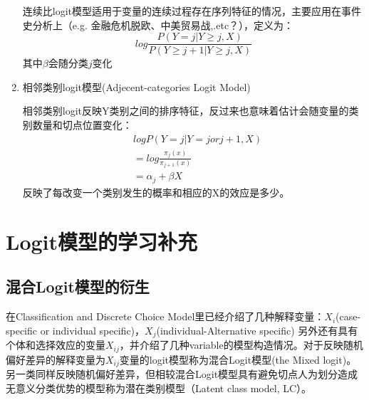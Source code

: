 \documentclass[cn]{elegantpaper}
\begin{document}
\begin{enumerate}
连续比logit模型适用于变量的连续过程存在序列特征的情况，主要应用在事件史分析上（e.g. 金融危机脱欧、中美贸易战,.etc？），定义为：
{\setlength\abovedisplayskip{5pt}
\setlength\belowdisplayskip{5pt}
\begin{equation} 
log \frac{P( Y = j |Y \geq j, X)}{P( Y \geq j+1 |Y \geq j, X)}
\end{equation}}
其中$\beta$会随分类$j$变化
\item{相邻类别logit模型(Adjecent-categories Logit Model)}

相邻类别logit反映Y类别之间的排序特征，反过来也意味着估计会随变量的类别数量和切点位置变化：
{\setlength\abovedisplayskip{5pt}
\setlength\belowdisplayskip{5pt}
\begin{equation} 
\begin{split}
&log {P( Y = j |Y = j or j+1, X)} \\
&= log \frac{\pi_{j}(x)}{\pi_{j+1}(x)}\\
&= \alpha_{j}+\beta X
\end{split}
\end{equation}}
反映了每改变一个类别发生的概率和相应的X的效应是多少。
\end{enumerate}

\section{Logit模型的学习补充}
\subsection{混合Logit模型的衍生}
在Classification and Discrete Choice Model里已经介绍了几种解释变量：$X_{i}$(case-specific or individual specific)，$X_{j}$(individual-Alternative specific) 另外还有具有个体和选择效应的变量$X_{ij}$，并介绍了几种variable的模型构造情况。对于反映随机偏好差异的解释变量为$X_{ij}$变量的logit模型称为混合Logit模型(the Mixed logit)。另一类同样反映随机偏好差异，但相较混合Logit模型具有避免切点人为划分造成无意义分类优势的模型称为潜在类别模型（Latent class model, LC）。
\end{document}
